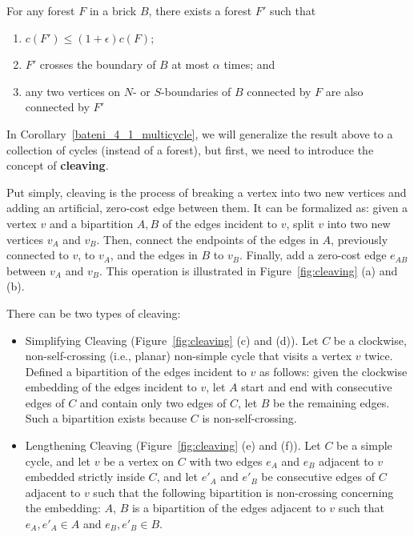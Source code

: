 \begin{flemma}  \label{bateni_4_1_forest}
    For any forest \(F\) in a brick \(B\), there exists a forest \(F'\) such that
\begin{enumerate}
    \item \(c(F') \leq (1 + \epsilon)c(F)\);
    \item \(F'\) crosses the boundary of \(B\) at most \(\alpha\) times; and
    \item any two vertices on \(N\)- or \(S\)-boundaries of \(B\) connected by \(F\) are also connected by \(F'\)
\end{enumerate}
\end{flemma}

In Corollary~\ref{bateni_4_1_multicycle}, we will generalize the result above to a collection of cycles (instead of a forest), but first, we need to introduce the concept of \textbf{cleaving}.

Put simply, cleaving is the process of breaking a vertex into two new vertices and adding an artificial, zero-cost edge between them. It can be formalized as: given a vertex \(v\) and a bipartition \(A, B\) of the edges incident to \(v\), split \(v\) into two new vertices \(v_A\) and \(v_B\). Then, connect the endpoints of the edges in \(A\), previously connected to \(v\), to \(v_A\), and the edges in \(B\) to \(v_B\). Finally, add a zero-cost edge \(e_{AB}\) between \(v_A\) and \(v_B\). This operation is illustrated in Figure~\ref{fig:cleaving} (a) and (b).

There can be two types of cleaving:
\begin{itemize}
    \item Simplifying Cleaving (Figure~\ref{fig:cleaving} (c) and (d)). Let \(C\) be a clockwise, non-self-crossing (i.e., planar) non-simple cycle that visits a vertex \(v\) twice. Defined a bipartition of the edges incident to \(v\) as follows: given the clockwise embedding of the edges incident to \(v\), let \(A\) start and end with consecutive edges of \(C\) and contain only two edges of \(C\), let \(B\) be the remaining edges. Such a bipartition exists because \(C\) is non-self-crossing.
    \item Lengthening Cleaving (Figure~\ref{fig:cleaving} (e) and (f)). Let \(C\) be a simple cycle, and let \(v\) be a vertex on \(C\) with two edges \(e_A\) and \(e_B\) adjacent to \(v\) embedded strictly inside \(C\), and let \(e'_A\) and \(e'_B\) be consecutive edges of \(C\) adjacent to \(v\) such that the following bipartition is non-crossing concerning the embedding: \(A\), \(B\) is a bipartition of the edges adjacent to \(v\) such that \(e_A, e'_A \in A\) and \(e_B, e'_B \in B\).
\end{itemize}

